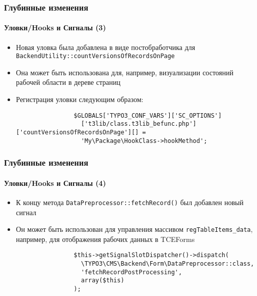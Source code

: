 
\begin{frame}[fragile]
	\frametitle{Глубинные изменения}
	\framesubtitle{Уловки/Hooks и Сигналы (3)}

	\begin{itemize}

		\item Новая уловка была добавлена в виде постобработчика для
			\small
				\texttt{BackendUtility::countVersionsOfRecordsOnPage}
			\normalsize

		\item Она может быть использована для, например, визуализации состояний рабочей области в дереве страниц
		\item Регистрация уловки следующим образом:

			\begin{lstlisting}
				$GLOBALS['TYPO3_CONF_VARS']['SC_OPTIONS']
				  ['t3lib/class.t3lib_befunc.php']['countVersionsOfRecordsOnPage'][] =
				  'My\Package\HookClass->hookMethod';
			\end{lstlisting}

	\end{itemize}

\end{frame}


\begin{frame}[fragile]
	\frametitle{Глубинные изменения}
	\framesubtitle{Уловки/Hooks и Сигналы (4)}

	\begin{itemize}

		\item К концу метода \texttt{DataPreprocessor::fetchRecord()} был добавлен новый сигнал
		\item Он может быть использован для управления массивом \texttt{regTableItems\_data}, например,
			для отображения рабочих данных в TCEForms

			\begin{lstlisting}
				$this->getSignalSlotDispatcher()->dispatch(
				  \TYPO3\CMS\Backend\Form\DataPreprocessor::class,
				  'fetchRecordPostProcessing',
				  array($this)
				);
			\end{lstlisting}

	\end{itemize}

\end{frame}

